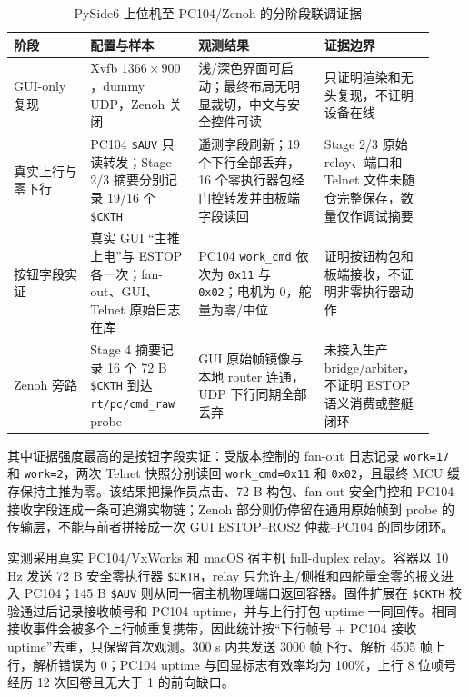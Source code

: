 \begin{table}[htbp]
\centering
\scriptsize
\setlength{\tabcolsep}{3pt}
\caption{PySide6 上位机至 PC104/Zenoh 的分阶段联调证据}\label{tab:ch05-gui-pc104-staged}
\begin{tabular}{@{}>{\raggedright\arraybackslash}p{0.17\linewidth}>{\raggedright\arraybackslash}p{0.24\linewidth}>{\raggedright\arraybackslash}p{0.28\linewidth}>{\raggedright\arraybackslash}p{0.23\linewidth}@{}}
\toprule
阶段 & 配置与样本 & 观测结果 & 证据边界 \\
\midrule
GUI-only 复现 & Xvfb \(1366\times900\)，dummy UDP，Zenoh 关闭 & 浅/深色界面可启动；最终布局无明显裁切，中文与安全控件可读 & 只证明渲染和无头复现，不证明设备在线 \\
真实上行与零下行 & PC104 \texttt{\$AUV} 只读转发；Stage 2/3 摘要分别记录 19/16 个 \texttt{\$CKTH} & 遥测字段刷新；19 个下行全部丢弃，16 个零执行器包经门控转发并由板端字段读回 & Stage 2/3 原始 relay、端口和 Telnet 文件未随仓完整保存，数量仅作调试摘要 \\
按钮字段实证 & 真实 GUI ``主推上电''与 ESTOP 各一次；fan-out、GUI、Telnet 原始日志在库 & PC104 \texttt{work\_cmd} 依次为 \texttt{0x11} 与 \texttt{0x02}；电机为 0，舵量为零/中位 & 证明按钮构包和板端接收，不证明非零执行器动作 \\
Zenoh 旁路 & Stage 4 摘要记录 16 个 72 B \texttt{\$CKTH} 到达 \texttt{rt/pc/cmd\_raw} probe & GUI 原始帧镜像与本地 router 连通，UDP 下行同期全部丢弃 & 未接入生产 bridge/arbiter，不证明 ESTOP 语义消费或整艇闭环 \\
\bottomrule
\end{tabular}
\end{table}

其中证据强度最高的是按钮字段实证：受版本控制的 fan-out 日志记录 \texttt{work=17} 和 \texttt{work=2}，两次 Telnet 快照分别读回 \texttt{work\_cmd=0x11} 和 \texttt{0x02}，且最终 MCU 缓存保持主推为零。该结果把操作员点击、72 B 构包、fan-out 安全门控和 PC104 接收字段连成一条可追溯实物链；Zenoh 部分则仍停留在通用原始帧到 probe 的传输层，不能与前者拼接成一次 GUI ESTOP--ROS2 仲裁--PC104 的同步闭环。

实测采用真实 PC104/VxWorks 和 macOS 宿主机 full-duplex relay。容器以 10 Hz 发送 72 B 安全零执行器 \texttt{\$CKTH}，relay 只允许主/侧推和四舵量全零的报文进入 PC104；145 B \texttt{\$AUV} 则从同一宿主机物理端口返回容器。固件扩展在 \texttt{\$CKTH} 校验通过后记录接收帧号和 PC104 uptime，并与上行打包 uptime 一同回传。相同接收事件会被多个上行帧重复携带，因此统计按``下行帧号 + PC104 接收 uptime''去重，只保留首次观测。300 s 内共发送 3000 帧下行、解析 4505 帧上行，解析错误为 0；PC104 uptime 与回显标志有效率均为 100\%，上行 8 位帧号经历 12 次回卷且无大于 1 的前向缺口。

